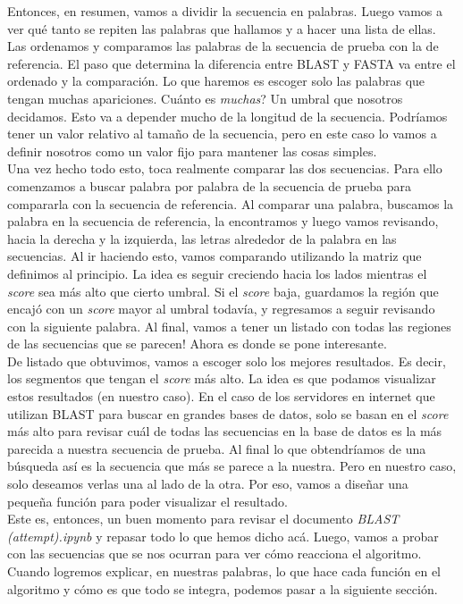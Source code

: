 \documentclass[10pt,letterpaper]{article}
\begin{document}
Entonces, en resumen, vamos a dividir la secuencia en palabras. Luego vamos a ver qu\'e tanto se repiten las palabras que hallamos y a hacer una lista de ellas. Las ordenamos y comparamos las palabras de la secuencia de prueba con la de referencia. El paso que determina la diferencia entre BLAST y FASTA va entre el ordenado y la comparaci\'on. Lo que haremos es escoger solo las palabras que tengan muchas apariciones. Cu\'anto es \emph{muchas}? Un umbral que nosotros decidamos. Esto va a depender mucho de la longitud de la secuencia. Podr\'iamos tener un valor relativo al tama\~no de la secuencia, pero en este caso lo vamos a definir nosotros como un valor fijo para mantener las cosas simples.\\

Una vez hecho todo esto, toca realmente comparar las dos secuencias. Para ello comenzamos a buscar palabra por palabra de la secuencia de prueba para compararla con la secuencia de referencia. Al comparar una palabra, buscamos la palabra en la secuencia de referencia, la encontramos y luego vamos revisando, hacia la derecha y la izquierda, las letras alrededor de la palabra en las secuencias. Al ir haciendo esto, vamos comparando utilizando la matriz que definimos al principio. La idea es seguir creciendo hacia los lados mientras el \emph{score} sea m\'as alto que cierto umbral. Si el \emph{score} baja, guardamos la regi\'on que encaj\'o con un \emph{score} mayor al umbral todav\'ia, y regresamos a seguir revisando con la siguiente palabra. Al final, vamos a tener un listado con todas las regiones de las secuencias que se parecen! Ahora es donde se pone interesante.\\

De listado que obtuvimos, vamos a escoger solo los mejores resultados. Es decir, los segmentos que tengan el \emph{score} m\'as alto. La idea es que podamos visualizar estos resultados (en nuestro caso). En el caso de los servidores en internet que utilizan BLAST para buscar en grandes bases de datos, solo se basan en el \emph{score} m\'as alto para revisar cu\'al de todas las secuencias en la base de datos es la m\'as parecida a nuestra secuencia de prueba. Al final lo que obtendr\'iamos de una b\'usqueda as\'i es la secuencia que m\'as se parece a la nuestra. Pero en nuestro caso, solo deseamos verlas una al lado de la otra. Por eso, vamos a dise\~nar una peque\~na funci\'on para poder visualizar el resultado.\\

Este es, entonces, un buen momento para revisar el documento \emph{BLAST (attempt).ipynb} y repasar todo lo que hemos dicho ac\'a. Luego, vamos a probar con las secuencias que se nos ocurran para ver c\'omo reacciona el algoritmo. Cuando logremos explicar, en nuestras palabras, lo que hace cada funci\'on en el algoritmo y c\'omo es que todo se integra, podemos pasar a la siguiente secci\'on.
\end{document}

